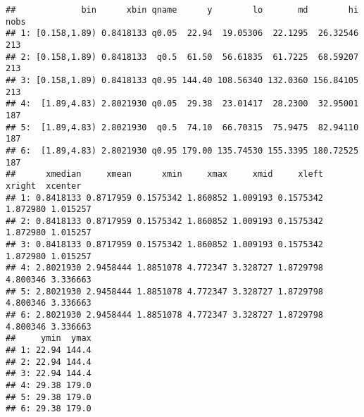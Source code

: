 \documentclass[
]{book}
\newenvironment{Shaded}{\begin{snugshade}}{\end{snugshade}}
\newcommand{\CommentTok}[1]{\textcolor[rgb]{0.56,0.35,0.01}{\textit{#1}}}
\newcommand{\DataTypeTok}[1]{\textcolor[rgb]{0.13,0.29,0.53}{#1}}
\newcommand{\DecValTok}[1]{\textcolor[rgb]{0.00,0.00,0.81}{#1}}
\newcommand{\ErrorTok}[1]{\textcolor[rgb]{0.64,0.00,0.00}{\textbf{#1}}}
\newcommand{\KeywordTok}[1]{\textcolor[rgb]{0.13,0.29,0.53}{\textbf{#1}}}
\newcommand{\NormalTok}[1]{#1}
\newcommand{\OperatorTok}[1]{\textcolor[rgb]{0.81,0.36,0.00}{\textbf{#1}}}
\newcommand{\StringTok}[1]{\textcolor[rgb]{0.31,0.60,0.02}{#1}}
\begin{document}
\begin{Shaded}
\end{Shaded}

\begin{verbatim}
##             bin      xbin qname      y        lo       md        hi nobs
## 1: [0.158,1.89) 0.8418133 q0.05  22.94  19.05306  22.1295  26.32546  213
## 2: [0.158,1.89) 0.8418133  q0.5  61.50  56.61835  61.7225  68.59207  213
## 3: [0.158,1.89) 0.8418133 q0.95 144.40 108.56340 132.0360 156.84105  213
## 4:  [1.89,4.83) 2.8021930 q0.05  29.38  23.01417  28.2300  32.95001  187
## 5:  [1.89,4.83) 2.8021930  q0.5  74.10  66.70315  75.9475  82.94110  187
## 6:  [1.89,4.83) 2.8021930 q0.95 179.00 135.74530 155.3395 180.72525  187
##      xmedian     xmean      xmin     xmax     xmid     xleft   xright  xcenter
## 1: 0.8418133 0.8717959 0.1575342 1.860852 1.009193 0.1575342 1.872980 1.015257
## 2: 0.8418133 0.8717959 0.1575342 1.860852 1.009193 0.1575342 1.872980 1.015257
## 3: 0.8418133 0.8717959 0.1575342 1.860852 1.009193 0.1575342 1.872980 1.015257
## 4: 2.8021930 2.9458444 1.8851078 4.772347 3.328727 1.8729798 4.800346 3.336663
## 5: 2.8021930 2.9458444 1.8851078 4.772347 3.328727 1.8729798 4.800346 3.336663
## 6: 2.8021930 2.9458444 1.8851078 4.772347 3.328727 1.8729798 4.800346 3.336663
##     ymin  ymax
## 1: 22.94 144.4
## 2: 22.94 144.4
## 3: 22.94 144.4
## 4: 29.38 179.0
## 5: 29.38 179.0
## 6: 29.38 179.0
\end{verbatim}
\end{document}
